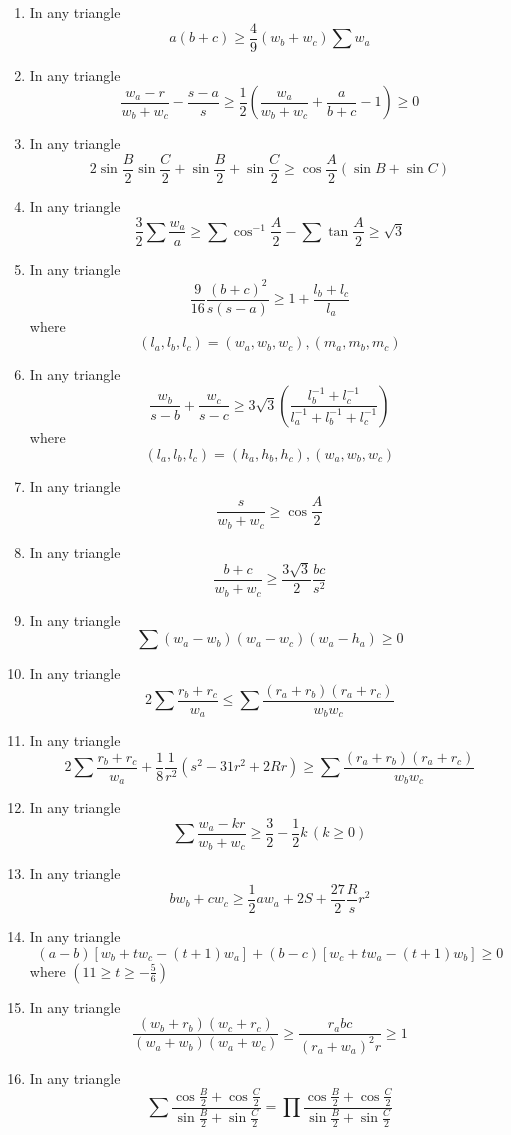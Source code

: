 \documentclass{report}
\begin{document}
\begin{enumerate}
	\item In any triangle$$a(b+c) \geq \frac{4}{9}(w_b+w_c)\sum{w_a}$$
	\item In any triangle$$ \frac {w_a - r}{w_b + w_c}-\frac {s - a}{s} \geq \frac {1}{2}\left( \frac {w_a}{w_b + w_c} + \frac {a}{b + c} - 1\right) \geq 0$$
	\item In any triangle$$2\sin\frac {B}{2}\sin\frac {C}{2} + \sin\frac {B}{2} + \sin\frac {C}{2}\geq\cos\frac {A}{2}(\sin{B} + \sin{C})$$
	\item In any triangle$$\frac {3}{2}\sum\frac {w_a}{a}\geq \sum\cos^{ - 1}\frac {A}{2} - \sum\tan\frac {A}{2}\geq \sqrt {3}$$
	\item In any triangle$$\frac {9}{16}\frac {(b + c)^2}{s(s - a)}\geq 1 + \frac {l_b + l_c}{l_a}$$where$$ \left( l_a,l_b,l_c\right)  = \left( w_a,w_b,w_c\right) ,\left( m_a,m_b,m_c\right) $$
	\item In any triangle$$ \frac {w_b}{s - b} + \frac {w_c}{s - c}\geq 3\sqrt {3}\left( \frac {l_b^{ - 1} + l_c^{ - 1}}{l_a^{ - 1} + l_b^{ - 1} + l_c^{ - 1}}\right) $$where$$ \left( l_a,l_b,l_c\right)  = \left( h_a,h_b,h_c\right) ,\left( w_a,w_b,w_c\right) $$
	\item In any triangle$$\frac{s}{w_b+w_c}\geq \cos\frac{A}{2}$$
	\item In any triangle$$\frac {b + c}{w_b + w_c}\geq \frac {3\sqrt {3}}{2}\frac {bc}{s^2}$$
	\item In any triangle$$\sum{(w_a - w_b)(w_a - w_c)(w_a - h_a)}\geq0$$	
	\item In any triangle$$2\sum\frac {r_b + r_c}{w_a} \le \sum\frac {(r_a + r_b)(r_a + r_c)}{w_bw_c}$$
	\item In any triangle$$2\sum\frac {r_b + r_c}{w_a} + \frac {1}{8}\frac {1}{r^2}(s^2 - 31r^2 + 2Rr) \geq \sum\frac {(r_a + r_b)(r_a + r_c)}{w_bw_c}$$
	\item In any triangle$$\sum\frac {w_a - kr}{w_b + w_c}\geq \frac {3}{2} - \frac {1}{2}k\, (k\geq0)$$
	\item In any triangle$$bw_b+cw_c\geq \frac{1}{2}aw_a+2S+\frac{27}{2}\frac{R}{s}r^2$$
	\item In any triangle$$ (a - b)[w_b + tw_c - (t + 1)w_a] + (b - c)[w_c + tw_a - (t + 1)w_b]\geq 0$$where $(11\geq t\geq - \frac {5}{6})$
	\item In any triangle$$\frac {(w_b + r_b)(w_c + r_c)}{(w_a + w_b)(w_a + w_c)}\geq \frac {r_abc}{(r_a + w_a)^2r}\geq 1$$
	\item In any triangle$$\sum\frac {\cos\frac {B}{2} + \cos\frac {C}{2}}{\sin\frac {B}{2} + \sin\frac {C}{2}} = \prod\frac {\cos\frac {B}{2} + \cos\frac {C}{2}}{\sin\frac {B}{2} + \sin\frac {C}{2}}$$

\end{enumerate}
\end{document}
